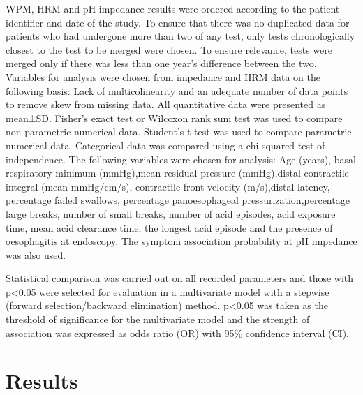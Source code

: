 \documentclass[english,man,floatsintext]{apa6}
\begin{document}
WPM, HRM and pH impedance results were ordered according to the patient identifier and date of the study. To ensure that there was no duplicated data for patients who had undergone more than two of any test, only tests chronologically closest to the test to be merged were chosen. To ensure relevance, tests were merged only if there was less than one year's difference between the two. Variables for analysis were chosen from impedance and HRM data on the following basis: Lack of multicolinearity and an adequate number of data points to remove skew from missing data. All quantitative data were presented as mean±SD. Fisher's exact test or Wilcoxon rank sum test was used to compare non-parametric numerical data. Student's t-test was used to compare parametric numerical data. Categorical data was compared using a chi-squared test of independence. The following variables were chosen for analysis: Age (years), basal respiratory minimum (mmHg),mean residual pressure (mmHg),distal contractile integral (mean mmHg/cm/s), contractile front velocity (m/s),distal latency, percentage failed swallows, percentage panoesophageal pressurization,percentage large breaks, number of small breaks, number of acid episodes, acid exposure time, mean acid clearance time, the longest acid episode and the presence of oesophagitis at endoscopy. The symptom association probability at pH impedance was also used.

Statistical comparison was carried out on all recorded parameters and those with p\textless{}0.05 were selected for evaluation in a multivariate model with a stepwise (forward selection/backward elimination) method. p\textless{}0.05 was taken as the threshold of significance for the multivariate model and the strength of association was expressed as odds ratio (OR) with 95\% confidence interval (CI).

\hypertarget{results}{%
\section{Results}\label{results}}
\end{document}
